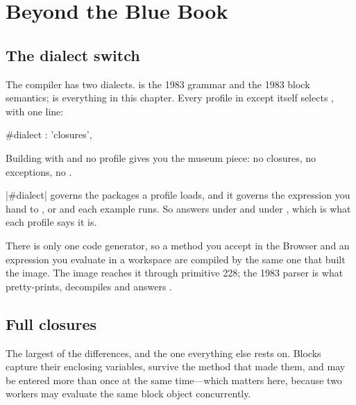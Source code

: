 \chapter{Beyond the Blue Book}
\label{ch:beyond}


\section{The dialect switch}

The compiler has two dialects.  is the 1983 grammar and the 1983
block semantics;  is everything in this chapter. Every profile in
 except  itself selects , with one line:

\begin{st}
#dialect : 'closures',
\end{st}

Building with  and no profile gives you the
museum piece: no closures, no exceptions, no .

\begin{stnote}
\ct|#dialect| governs the packages a profile loads, and it governs the
expression you hand to ,  or  and each
example  runs. So  answers
 under  and 
under , which is what each profile says it is.

There is only one code generator, so a method you accept in the Browser and
an expression you evaluate in a workspace are compiled by the same one that
built the image. The image reaches it through primitive 228; the 1983 parser
is what pretty-prints, decompiles and answers .
\end{stnote}

\section{Full closures}

The largest of the differences, and the one everything else rests on. Blocks
capture their enclosing variables, survive the method that made them, and may
be entered more than once at the same time---which matters here, because two
workers may evaluate the same block object concurrently.

